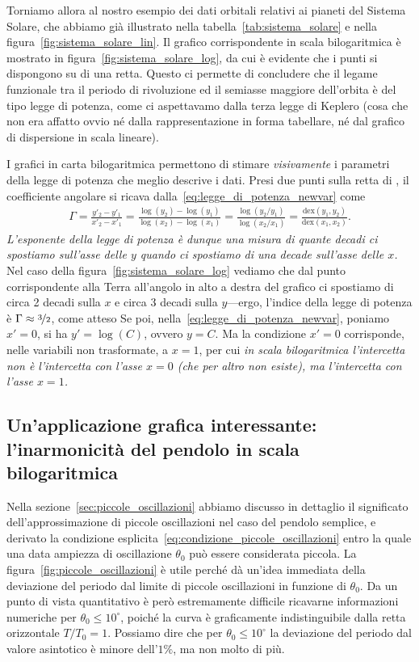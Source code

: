Torniamo allora al nostro esempio dei dati orbitali relativi ai pianeti del
Sistema Solare, che abbiamo già illustrato nella
tabella~\ref{tab:sistema_solare} e nella figura~\ref{fig:sistema_solare_lin}.
Il grafico corrispondente in scala bilogaritmica è mostrato in
figura~\ref{fig:sistema_solare_log}, da cui è evidente che i punti si
dispongono su di una retta. Questo ci permette di concludere che il legame
funzionale tra il periodo di rivoluzione ed il semiasse maggiore dell'orbita
è del tipo legge di potenza, come ci aspettavamo dalla terza legge di
Keplero (cosa che non era affatto ovvio né dalla rappresentazione in forma
tabellare, né dal grafico di dispersione in scala lineare).

I grafici in carta bilogaritmica permettono di stimare \emph{visivamente} i
parametri della legge di potenza che meglio descrive i dati. Presi due punti sulla
retta di \fit, il coefficiente angolare si ricava dalla~\eqref{eq:legge_di_potenza_newvar}
come
\begin{align}\label{eq:legge_di_potenza_fit_index}
  \Gamma = \frac{y'_2 - y'_1}{x'_2 - x'_1} =
  \frac{\log(y_2) - \log(y_1)}{\log(x_2) - \log(x_1)} =
  \frac{\log(y_2/y_1)}{\log(x_2/x_1)} =
  \frac{\text{dex}(y_1, y_2)}{\text{dex}(x_1, x_2)}.
\end{align}
\emph{L'esponente della legge di potenza è dunque una misura di quante decadi ci
spostiamo sull'asse delle $y$ quando ci spostiamo di una decade sull'asse delle
$x$.} Nel caso della figura~\ref{fig:sistema_solare_log} vediamo che dal punto
corrispondente alla Terra all'angolo in alto a destra del grafico ci spostiamo
di circa 2 decadi sulla $x$ e circa 3 decadi sulla $y$---ergo, l'indice della
legge di potenza \`e $\Gamma \approx \nicefrac{3}{2}$, come atteso
Se poi, nella~\eqref{eq:legge_di_potenza_newvar}, poniamo $x' = 0$, si ha
$y' = \log(C)$, ovvero $y = C$. Ma la condizione $x' = 0$ corrisponde, nelle
variabili non trasformate, a $x = 1$, per cui \emph{in scala bilogaritmica
l'intercetta non è l'intercetta con l'asse $x = 0$ (che per altro non esiste),
ma l'intercetta con l'asse $x = 1$.}


\subsection{Un'applicazione grafica interessante: l'inarmonicità del pendolo
  in scala bilogaritmica}

Nella sezione~\ref{sec:piccole_oscillazioni} abbiamo discusso in dettaglio il
significato dell'approssimazione di piccole oscillazioni nel caso del pendolo
semplice, e derivato la condizione esplicita~\eqref{eq:condizione_piccole_oscillazioni}
entro la quale una data ampiezza di oscillazione $\theta_0$ può essere considerata
piccola.
La figura~\ref{fig:piccole_oscillazioni} è utile perché dà un'idea immediata
della deviazione del periodo dal limite di piccole oscillazioni in funzione di $\theta_0$.
Da un punto di vista quantitativo è però estremamente difficile ricavarne
informazioni numeriche per $\theta_0 \leq 10^\circ$, poiché la curva è
graficamente indistinguibile dalla retta orizzontale $T/T_0 = 1$. Possiamo
dire che per $\theta_0 \leq 10^\circ$ la deviazione del periodo dal valore
asintotico è minore dell'$1\%$, ma non molto di pi\`u.

